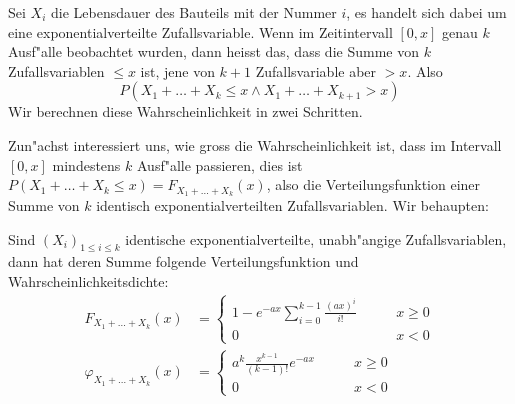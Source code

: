 Sei $X_i$ die Lebensdauer des Bauteils mit der Nummer $i$, es handelt
sich dabei um eine exponentialverteilte Zufallsvariable.
Wenn im Zeitintervall
$[0,x]$ genau $k$ Ausf"alle beobachtet wurden, dann heisst das, dass die
Summe von $k$ Zufallsvariablen $\le x$ ist, jene von $k+1$ Zufallsvariable
aber $>x$.
Also
\[
P(X_1+\dots+X_k\le x \wedge X_1+\dots+X_{k+1}>x)
\]
Wir berechnen diese Wahrscheinlichkeit in zwei Schritten.

Zun"achst interessiert uns, wie gross die Wahrscheinlichkeit ist, dass im
Intervall $[0,x]$ mindestens $k$ Ausf"alle passieren, dies ist
$P(X_1+\dots+X_k\le x)=F_{X_1+\dots+X_k}(x)$, also die Verteilungsfunktion
einer Summe von $k$ identisch exponentialverteilten Zufallsvariablen.
Wir behaupten:
\begin{satz}Sind $(X_i)_{1\le i\le k}$ identische exponentialverteilte,
unabh"angige Zufallsvariablen, dann hat deren Summe folgende Verteilungsfunktion
und Wahrscheinlichkeitsdichte:
\begin{align*}
F_{X_1+\dots+X_k}(x)&=\begin{cases}
{\displaystyle 1-e^{-ax}\sum_{i=0}^{k-1}\frac{(ax)^i}{i!}}&\qquad x \ge 0\\
0&\qquad x < 0
\end{cases}
\\
\varphi_{X_1+\dots+X_k}(x)&=\begin{cases}
{\displaystyle a^k\frac{x^{k-1}}{(k-1)!}e^{-ax}}&\qquad x\ge0\\
0&\qquad x < 0\end{cases}
\end{align*}
\end{satz}
